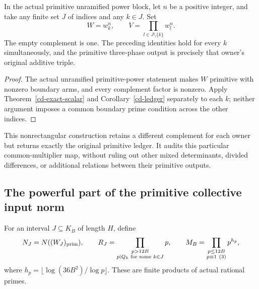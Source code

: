 \begin{corollary}
\label{cd-complements}
In the actual primitive unramified power block, let \(n\) be a positive
integer, and take any finite set \(J\) of indices and any \(k\in J\). Set
\[
 W=w_k^n,\qquad V=\prod_{l\in J\setminus\{k\}}w_l^n.
\]
The empty complement is one. The preceding identities hold for every
\(k\) simultaneously, and the primitive three-phase output is precisely
that owner's original additive triple.
\end{corollary}
\begin{proof}
The actual unramified primitive-power statement makes \(W\) primitive
with nonzero boundary arms, and every complement factor is nonzero.
Apply Theorem~\ref{cd-exact-scalar} and Corollary~\ref{cd-ledger}
separately to each \(k\); neither argument imposes a common boundary
prime condition across the other indices.
\end{proof}

This nonrectangular construction retains a different complement for
each owner but returns exactly the original primitive ledger. It audits
this particular common-multiplier map, without ruling out other mixed
determinants, divided differences, or additional relations between their
primitive outputs.

\subsection{The powerful part of the primitive collective input norm}

For an interval \(J\subseteq K_B\) of length \(H\), define
\[
 N_J=N((W_J)_{\rm prim}),\qquad
 R_J=\prod_{\substack{p>12B\\p\mid Q_k\text{ for some }k\in J}}p,
 \qquad
 M_B=\prod_{\substack{p\le12B\\p\equiv1\ (3)}}p^{h_p},
\]
where \(h_p=\lfloor\log(36B^2)/\log p\rfloor\). These are finite
products of actual rational primes.

